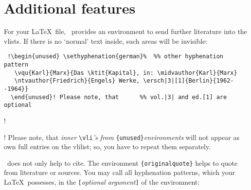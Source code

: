 \documentclass[12pt,a4paper]{article}
\newcommand{\pbs}{\string\ \unskip}
\newcommand{\bs}{\protect\pbs}
\renewcommand{\{}{{\normalfont\lbashortmem}}
\renewcommand{\}}{{\normalfont\rbashortmem}}
\begin{document}
\renewcommand{\epertitlename}{\texttt{\bs printnumper} \ \mempertitlename}
\vspace{-.5ex}\printnumper

\let\memarqtitlename=\earqtitlename
\renewcommand{\earqtitlename}{\texttt{\bs printarq} \ \memarqtitlename}
\vspace{-.5ex}\printarq {}

\renewcommand{\earqtitlename}{\texttt{\bs printnumarq} \ \memarqtitlename}
\vspace{-.5ex}\printnumarq



\newpage
\section{Additional features}

For your \LaTeX\ file, \BibArts\ provides an environment to send further
literature into the v\fhy lists. If there is no `normal' text inside, 
such areas will be invisible:

\vspace{-1.25ex}
{\footnotesize\begin{verbatim}
 !\begin{unused} \sethyphenation{german}%  %% other hyphenation pattern
   \vqu{Karl}{Marx}{Das \ktit{Kapital}, in: \midvauthor{Karl}{Marx}
   \ntvauthor{Friedrich}{Engels} Werke, \ersch|3|[1]{Berlin}{1962--1964}}
  \end{unused}! Please note, that      %% vol.|3| and ed.[1] are optional
\end{verbatim}}

\vspace{-1ex}\noindent
 !\begin{unused} %
  \end{unused}! Please note, that \textit{inner} \verb|\vli|\textit{'s from}
\verb|{unused}|\hy\textit{environments} will not appear as own full entries on the
vli\hy list; so, you have to repeat them separately.

\vspace{1.5ex}\noindent
\BibArts\ does not only help to cite. The environment \verb|{originalquote}|
helps to quote from literature or sources. You may call all hyphenation
patterns, which your \LaTeX\ possesses, in the \verb|[|\textit{optional
argument}\verb|]| of the environment:
\end{document}
